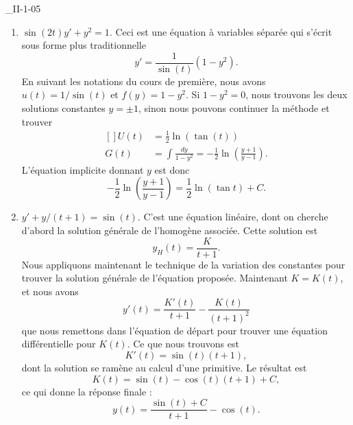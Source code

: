 

\begin{corrige}{_II-1-05}

\begin{enumerate}

	\item $\sin(2t)y'+y^2=1$. 
Ceci est une équation à variables séparée qui s'écrit sous forme plus traditionnelle
\begin{equation}
	y'=\frac{1}{ \sin(t) }(1-y^2).
\end{equation}
En suivant les notations du cours de première, nous avons $u(t)=1/\sin(t)$ et $f(y)=1-y^2$. Si $1-y^2=0$, nous trouvons les deux solutions constantes $y=\pm 1$, sinon nous pouvons continuer la méthode et trouver
\begin{equation}
	\begin{aligned}[]
		U(t)	&=\frac{ 1 }{2}\ln(\tan(t))\\
		G(t)	&=\int\frac{ dy }{ 1-y^2 }=-\frac{ 1 }{2}\ln\left( \frac{ y+1 }{ y-1 } \right).
	\end{aligned}
\end{equation}
L'équation implicite donnant $y$ est donc
\begin{equation}
	-\frac{ 1 }{2}\ln\left( \frac{ y+1 }{ y-1 } \right)=\frac{ 1 }{2}\ln(\tan t)+C.
\end{equation}

	\item $y'+y/(t+1)=\sin(t)$. 
C'est une équation linéaire, dont on cherche d'abord la solution générale de l'homogène associée. Cette solution est
\begin{equation}
	y_H(t)=\frac{ K }{ t+1 }.
\end{equation}
Nous appliquons maintenant le technique de la variation des constantes pour trouver la solution générale de l'équation proposée. Maintenant $K=K(t)$, et nous avons
\begin{equation}
	y'(t)=\frac{ K'(t) }{ t+1 }-\frac{ K(t) }{ (t+1)^2 }
\end{equation}
que nous remettons dans l'équation de départ pour trouver une équation différentielle pour $K(t)$. Ce que nous trouvons est
\begin{equation}
	K'(t)=\sin(t)(t+1),
\end{equation}
dont la solution se ramène au calcul d'une primitive. Le résultat est
\begin{equation}
	K(t)=\sin(t)-\cos(t)(t+1)+C,
\end{equation}
ce qui donne la réponse finale :
\begin{equation}
	y(t)=\frac{ \sin(t)+C }{ t+1 }-\cos(t).
\end{equation}


\end{enumerate}
\end{corrige}
